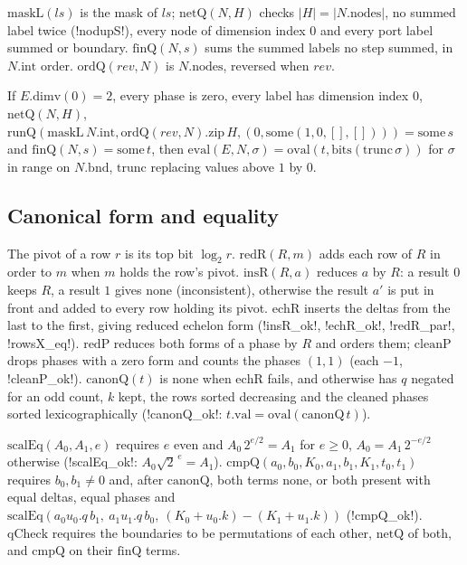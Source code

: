 $\mathrm{maskL}(ls)$ is the mask of $ls$; $\mathrm{netQ}(N,H)$ checks $|H|=|N.\mathrm{nodes}|$, no summed label twice (\lean!nodupS!), every node of dimension index $0$ and every port label summed or boundary. $\mathrm{finQ}(N,s)$ sums the summed labels no step summed, in $N.\mathrm{int}$ order. $\mathrm{ordQ}(\mathit{rev},N)$ is $N.\mathrm{nodes}$, reversed when $\mathit{rev}$.

\begin{theorem}
If $E.\mathrm{dimv}(0)=2$, every phase is zero, every label has dimension index $0$, $\mathrm{netQ}(N,H)$, $\mathrm{runQ}(\mathrm{maskL}\,N.\mathrm{int},\mathrm{ordQ}(\mathit{rev},N).\mathrm{zip}\,H,(0,\mathrm{some}(1,0,[],[])))=\mathrm{some}\,s$ and $\mathrm{finQ}(N,s)=\mathrm{some}\,t$, then $\mathrm{eval}(E,N,\sigma)=\mathrm{oval}(t,\mathrm{bits}(\mathrm{trunc}\,\sigma))$ for $\sigma$ in range on $N.\mathrm{bnd}$, $\mathrm{trunc}$ replacing values above $1$ by $0$.
\end{theorem}

\subsection{Canonical form and equality}

\begin{definition}
The pivot of a row $r$ is its top bit $\log_2 r$. $\mathrm{redR}(R,m)$ adds each row of $R$ in order to $m$ when $m$ holds the row's pivot. $\mathrm{insR}(R,a)$ reduces $a$ by $R$: a result $0$ keeps $R$, a result $1$ gives $\mathrm{none}$ (inconsistent), otherwise the result $a'$ is put in front and added to every row holding its pivot. $\mathrm{echR}$ inserts the deltas from the last to the first, giving reduced echelon form (\lean!insR_ok!, \lean!echR_ok!, \lean!redR_par!, \lean!rowsX_eq!). $\mathrm{redP}$ reduces both forms of a phase by $R$ and orders them; $\mathrm{cleanP}$ drops phases with a zero form and counts the phases $(1,1)$ (each $-1$, \lean!cleanP_ok!). $\mathrm{canonQ}(t)$ is $\mathrm{none}$ when $\mathrm{echR}$ fails, and otherwise has $q$ negated for an odd count, $k$ kept, the rows sorted decreasing and the cleaned phases sorted lexicographically (\lean!canonQ_ok!: $t.\mathrm{val}=\mathrm{oval}(\mathrm{canonQ}\,t)$).
\end{definition}

\begin{definition}
$\mathrm{scalEq}(A_0,A_1,e)$ requires $e$ even and $A_0\,2^{e/2}=A_1$ for $e\ge0$, $A_0=A_1\,2^{-e/2}$ otherwise (\lean!scalEq_ok!: $A_0\sqrt2^{\,e}=A_1$). $\mathrm{cmpQ}(a_0,b_0,K_0,a_1,b_1,K_1,t_0,t_1)$ requires $b_0,b_1\neq0$ and, after $\mathrm{canonQ}$, both terms $\mathrm{none}$, or both present with equal deltas, equal phases and $\mathrm{scalEq}(a_0u_0.q\,b_1,\ a_1u_1.q\,b_0,\ (K_0+u_0.k)-(K_1+u_1.k))$ (\lean!cmpQ_ok!). $\mathrm{qCheck}$ requires the boundaries to be permutations of each other, $\mathrm{netQ}$ of both, and $\mathrm{cmpQ}$ on their $\mathrm{finQ}$ terms.
\end{definition}

